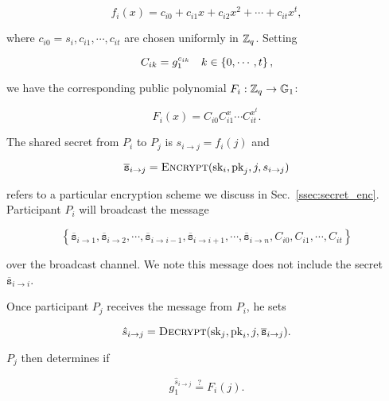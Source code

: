 \begin{equation}
    f_{i}(x) = c_{i0} + c_{i1}x + c_{i2}x^{2} + \cdots + c_{it}x^{t},
\end{equation}

\noindent
where $c_{i0} = s_{i}, c_{i1}, \cdots, c_{it}$ are chosen uniformly
in $\mathbb{Z}_{q}$.
Setting

\begin{equation}
    C_{ik} = g_{1}^{c_{ik}}\quad k\in\left\{ 0,\cdots,t \right\},
\end{equation}

\noindent
we have the corresponding public polynomial $F_{i}:\mathbb{Z}_{q}\to\mathbb{G}_{1}$:

\begin{equation}
    F_{i}(x) = C_{i0}C_{i1}^{x}\cdots C_{it}^{x^{t}}.
\end{equation}

\noindent
The shared secret from $P_{i}$ to $P_{j}$ is $s_{i\to j} = f_{i}(j)$
and

\begin{equation}
    \overline{\texttt{s}}_{i\to j} =
        \textsc{Encrypt}(\text{sk}_{i},\text{pk}_{j},j, s_{i\to j})
\end{equation}

\noindent
refers to a particular encryption scheme we discuss
in Sec.~\ref{ssec:secret_enc}.
Participant $P_{i}$ will broadcast the message

\begin{equation}
    \left\{ 
        \overline{\texttt{s}}_{i\to 1}, \overline{\texttt{s}}_{i\to 2},
            \cdots,
            \overline{\texttt{s}}_{i\to i-1},
            \overline{\texttt{s}}_{i\to i+1},
            \cdots,
            \overline{\texttt{s}}_{i\to n},
        C_{i0}, C_{i1}, \cdots, C_{it}
    \right\}
\end{equation}

\noindent
over the broadcast channel.
We note this message does not include the secret
$\overline{\texttt{s}}_{i\to i}$.

Once participant $P_{j}$ receives the message from $P_{i}$,
he sets

\begin{equation}
    \hat{s}_{i\to j} = \textsc{Decrypt}(\text{sk}_{j},\text{pk}_{i}, j,
        \overline{\texttt{s}}_{i\to j}).
\end{equation}

\noindent
$P_{j}$ then determines if

\begin{equation}
    g_{1}^{\hat{s}_{i\to j}} \overset{?}{=} F_{i}(j).
    \label{eq:secret_share_test}
\end{equation}


